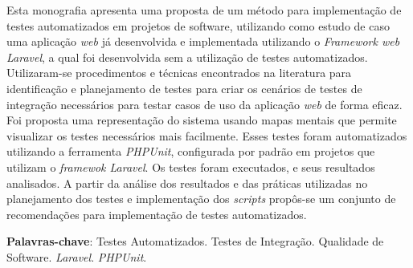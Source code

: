 
\begin{resumo}[RESUMO]
\begin{SingleSpacing}


Esta monografia apresenta uma proposta de um método para implementação de testes automatizados em projetos de software, utilizando como estudo de caso uma aplicação \emph{web} já desenvolvida e implementada utilizando o \emph{Framework web Laravel}, a qual foi desenvolvida sem a utilização de testes automatizados. Utilizaram-se procedimentos e técnicas encontrados na literatura para identificação e planejamento de testes para criar os cenários de testes de integração necessários para testar casos de uso da aplicação \emph{web} de forma eficaz. Foi proposta uma representação do sistema usando mapas mentais que permite visualizar os testes necessários mais facilmente. Esses testes foram automatizados utilizando a ferramenta \emph{PHPUnit}, configurada por padrão em projetos que utilizam o \emph{framewok Laravel}. Os testes foram executados, e seus resultados  analisados. A partir da análise dos resultados e das práticas utilizadas no planejamento dos testes e implementação dos \emph{scripts} propôs-se um conjunto de recomendações para implementação de testes automatizados.

\textbf{Palavras-chave}: Testes Automatizados. Testes de Integração. Qualidade de Software. \emph{Laravel}. \emph{PHPUnit}.

\end{SingleSpacing}
\end{resumo}

